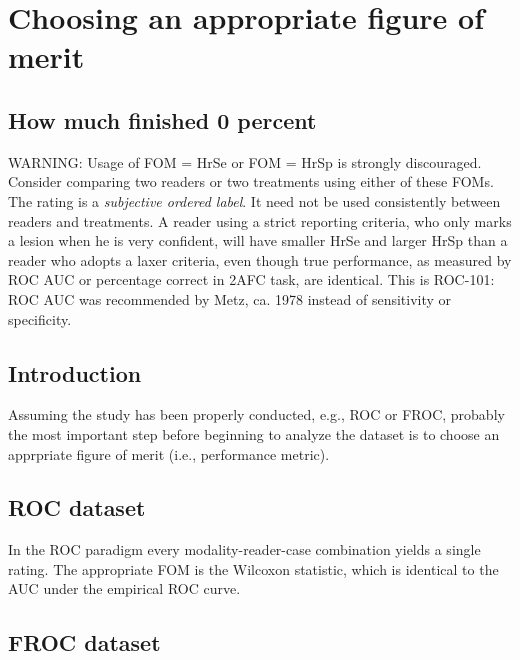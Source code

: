\documentclass[
]{book}
\begin{document}
\hypertarget{choosing-an-appropriate-figure-of-merit}{%
\chapter*{Choosing an appropriate figure of merit}\label{choosing-an-appropriate-figure-of-merit}}

\hypertarget{choice-of-fom-hmf}{%
\section{How much finished 0 percent}\label{choice-of-fom-hmf}}

WARNING: Usage of FOM = HrSe or FOM = HrSp is strongly discouraged. Consider comparing two readers or two treatments using either of these FOMs. The rating is a \emph{subjective ordered label}. It need not be used consistently between readers and treatments. A reader using a strict reporting criteria, who only marks a lesion when he is very confident, will have smaller HrSe and larger HrSp than a reader who adopts a laxer criteria, even though true performance, as measured by ROC AUC or percentage correct in 2AFC task, are identical. This is ROC-101: ROC AUC was recommended by Metz, ca. 1978 instead of sensitivity or specificity.

\hypertarget{choice-of-fom-introduction}{%
\section{Introduction}\label{choice-of-fom-introduction}}

Assuming the study has been properly conducted, e.g., ROC or FROC, probably the most important step before beginning to analyze the dataset is to choose an apprpriate figure of merit (i.e., performance metric).

\hypertarget{choice-of-fom-roc}{%
\section{ROC dataset}\label{choice-of-fom-roc}}

In the ROC paradigm every modality-reader-case combination yields a single rating. The appropriate FOM is the Wilcoxon statistic, which is identical to the AUC under the empirical ROC curve.

\hypertarget{choice-of-fom-froc}{%
\section{FROC dataset}\label{choice-of-fom-froc}}
\end{document}
